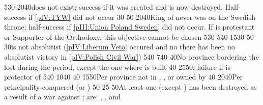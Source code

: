 {5}{30}{\EU@objBaltiqueTrade}%
%
%
{20}{40}{\GE does not exist; success if it was created and is now
  destroyed. Half-success if \ref{pIV:TYW} did not occur}%
%
%
{}{30}{}%
%
%
{}{50}{\EU@objDMB}%
%
%
{20}{40}{King of  never was on the Swedish throne;
  half-success if \ref{pIII:Union Poland Sweden} did not occur. If
  \paysmajeurPologne is protestant or Supporter of the Orthodoxy, this
  objective cannot be chosen}%
%
%
%
{5}{30}{\EU@objBaltiqueTrade}%
%
%
{5}{40}{\EU@objEachCOLTP}%
%
%
{15}{30}{\EU@objNoRUSBaltique}%
%
%
{}{50}{\EU@objDMB}%
%
%
{}{30}{\paysmajeurPologne is not absolutist (\ref{pIV:Liberum Veto} occured
  and no there has been no absolutist victory in \ref{pIV:Polish Civil War})}%
% 
%
%
{5}{40}{\EU@objBaltiqueTrade}%
%
%
{7}{40}{\EU@objEachCOLTP}%
%
%
{}{40}{No province bordering the \regionBaltique lost during the period,
  except the one where  is built}%
%
%
{}{40}{\EU@objDMB}%
%
%
{25}{50}{\EU@objPOLVictory; failure if \paysmajeurFrance is protector of
  \paysPologne}%
%
%
%
{5}{40}{\EU@objBaltiqueTrade}%
%
%
{10}{40}{\EU@objEachCOLTP}%
%
%
{}{40}{}%
%
%
{15}{50}{Per province not in \regionNorvege, \regionDanemark, \regionFinlande
  or \regionSuede owned by \paysmajeurSuede}%
%
%
{}{40}{}%
%
 
%
%
{20}{40}{Per principality conquered (\payspskov or \paysryazan)}%
%
%
{}{50}{}%
%
%
{}{25}{}%
%
%
{}{50}{At least one  (except \paysSteppes) has been destroyed
  as a result of a war against \paysmajeurRussie;  are:
  \paysKazan, \paysAstrakhan, \paysCrimee and \paysCosaquesdon}%
